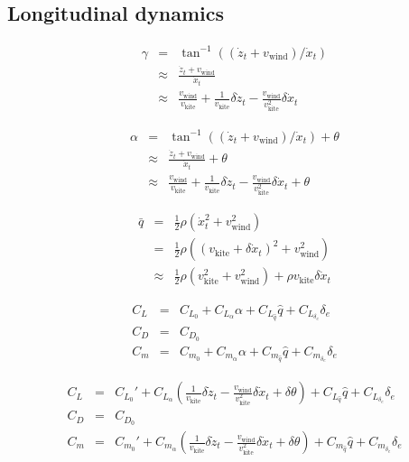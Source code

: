 \documentclass[11pt]{amsart}
\newcommand{\qbar}{\bar{q}}
\newcommand{\wind}{\mathrm{wind}}
\newcommand{\kite}{\mathrm{kite}}
\begin{document}
\subsection{Longitudinal dynamics}

\begin{eqnarray}
\gamma &=& \tan^{-1}((\dot{z}_t + v_{\wind}) / \dot{x}_t) \\
&\approx& \frac{\dot{z}_t + v_{\wind}}{\dot{x}_t} \\
&\approx& \frac{v_{\wind}}{v_{\kite}} + \frac{1}{v_{\kite}} \delta \dot{z}_t -
\frac{v_{\wind}}{v_{\kite}^2} \delta \dot{x}_t
\end{eqnarray}

\begin{eqnarray}
\alpha &=& \tan^{-1}((\dot{z}_t + v_{\wind}) / \dot{x}_t) + \theta \\
&\approx& \frac{\dot{z}_t + v_{\wind}}{\dot{x}_t} + \theta \\
&\approx& \frac{v_{\wind}}{v_{\kite}} + \frac{1}{v_{\kite}} \delta \dot{z}_t -
\frac{v_{\wind}}{v_{\kite}^2} \delta \dot{x}_t + \theta
\end{eqnarray}

\begin{eqnarray}
\qbar &=& \frac{1}{2} \rho \left( \dot{x}_t^2 + v_{\wind}^2 \right) \\
&=& \frac{1}{2} \rho \left( (v_{\kite} + \delta \dot{x}_t)^2 + v_{\wind}^2 \right) \\
&\approx& \frac{1}{2} \rho \left( v_{\kite}^2 + v_{\wind}^2 \right) +
\rho v_{\kite} \delta \dot{x}_t
\end{eqnarray}

\begin{eqnarray}
C_L &=& C_{L_0} + C_{L_{\alpha}} \alpha + C_{L_{\hat{q}}} \hat{q} +
C_{L_{\delta_e}} \delta_e \\
C_D &=& C_{D_0} \\
C_m &=& C_{m_0} + C_{m_{\alpha}} \alpha + C_{m_{\hat{q}}} \hat{q} +
C_{m_{\delta_e}} \delta_e
\end{eqnarray}

\begin{eqnarray}
C_L &=& C_{L_0}' + C_{L_{\alpha}} \left( \frac{1}{v_{\kite}} \delta \dot{z}_t -
\frac{v_{\wind}}{v_{\kite}^2} \delta \dot{x}_t + \delta \theta \right) +
C_{L_{\hat{q}}} \hat{q} +
C_{L_{\delta_e}} \delta_e \\
C_D &=& C_{D_0} \\
C_m &=& C_{m_0}' + C_{m_{\alpha}} \left( \frac{1}{v_{\kite}} \delta \dot{z}_t -
\frac{v_{\wind}}{v_{\kite}^2} \delta \dot{x}_t + \delta \theta \right) +
C_{m_{\hat{q}}} \hat{q} +
C_{m_{\delta_e}} \delta_e
\end{eqnarray}
\end{document}
